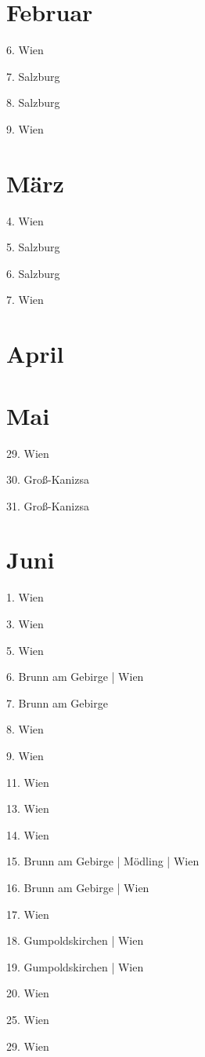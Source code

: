 \documentclass[twoside=false,titlepage=false,open=any, parskip=never, fontsize=10pt, headings=small, chapterprefix=false, appendixprefix=false, DIV=15]{scrbook}
\begin{document}
\begin{multicols}{3}
            \section*{Februar}
            6. Wien\par
            7. Salzburg\par
            8. Salzburg\par
            9. Wien\par
            \section*{März}
            4. Wien\par
            5. Salzburg\par
            6. Salzburg\par
            7. Wien\par
            \section*{April}
            \section*{Mai}
            29. Wien\par
            30. Groß-Kanizsa\par
            31. Groß-Kanizsa\par
            \section*{Juni}
            1. Wien\par
            3. Wien\par
            5. Wien\par
            6. Brunn am Gebirge | Wien\par
            7. Brunn am Gebirge\par
            8. Wien\par
            9. Wien\par
            11. Wien\par
            13. Wien\par
            14. Wien\par
            15. Brunn am Gebirge | Mödling | Wien\par
            16. Brunn am Gebirge | Wien\par
            17. Wien\par
            18. Gumpoldskirchen | Wien\par
            19. Gumpoldskirchen | Wien\par
            20. Wien\par
            25. Wien\par
            29. Wien\par

\end{multicols}
\end{document}
